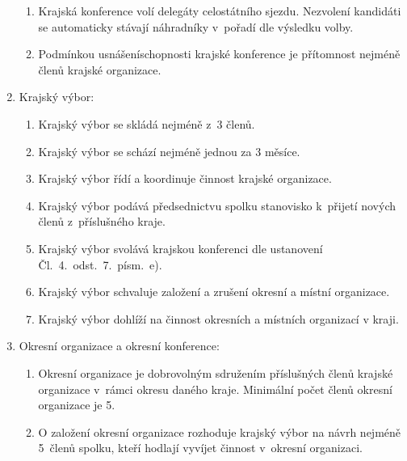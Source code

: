 \documentclass[a4paper]{article}
\begin{document}
\begin{enumerate}
\begin{enumerate}
        \item Krajská konference volí delegáty celostátního sjezdu. Nezvolení
            kandidáti se automaticky stávají náhradníky v~pořadí dle výsledku
            volby.

        \item Podmínkou usnášeníschopnosti krajské konference je přítomnost
            nejméně  členů krajské organizace.
        \end{enumerate}

    \item Krajský výbor:
        \begin{enumerate}
        \item Krajský výbor se skládá nejméně z~3 členů.

        \item Krajský výbor se schází nejméně jednou za 3 měsíce.

        \item Krajský výbor řídí a koordinuje činnost krajské organizace.

        \item Krajský výbor podává předsednictvu spolku stanovisko k~přijetí
            nových členů z~příslušného kraje.

        \item Krajský výbor svolává krajskou konferenci dle ustanovení
            Čl.~4.~odst.~7.~písm.~e).

        \item Krajský výbor schvaluje založení a zrušení
            okresní a místní organizace.

        \item Krajský výbor dohlíží na činnost okresních a místních organizací v kraji.

        \end{enumerate}

    \item Okresní organizace a okresní konference:
        \begin{enumerate}
        \item Okresní organizace je dobrovolným sdružením příslušných
            členů krajské organizace v~rámci okresu daného kraje. Minimální počet členů okresní organizace
            je 5.

        \item O založení okresní organizace rozhoduje krajský výbor na
            návrh nejméně 5~členů spolku, kteří hodlají vyvíjet činnost
            v~okresní organizaci.


\end{enumerate}
\end{enumerate}
\end{document}
